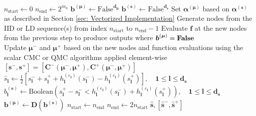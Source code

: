 \documentclass[graybox]{svmult}
\begin{document}
\begin{algorithm}[t]
\begin{algorithmic}
    \\ \hrulefill
    \State $n_\text{start} \gets 0$ 
    \State $n_\text{end} \gets 2^{m_0}$ 
    \State $\boldsymbol{b}^{(\boldsymbol{\mu})} \gets \text{False}^{\boldsymbol{d}_{\boldsymbol{\mu}}}$ 
    \State $\boldsymbol{b}^{(\boldsymbol{s})} \gets \text{False}^{\boldsymbol{d}_{\boldsymbol{s}}}$ 
    \State Set $\boldsymbol{\alpha}^{(\boldsymbol{\mu})}$ based on $\boldsymbol{\alpha}^{(\boldsymbol{s})}$ as described in Section \ref{sec: Vectorized Implementation}
     
        \State Generate nodes from the IID or LD sequence(s) from index $n_\text{start}$ to $n_\text{end}-1$
        \State Evaluate $\boldsymbol{f}$ at the new nodes from the previous step to produce outputs where $\boldsymbol{b}^{(\boldsymbol{\mu})}=\textbf{\text{False}}$ \\ 
        \State Update $\boldsymbol{\mu}^-$ and $\boldsymbol{\mu}^+$ based on the new nodes and function evaluations using the scalar CMC or QMC algorithms applied element-wise 
        \State $[\boldsymbol{s}^-,\boldsymbol{s}^+] = \left[\boldsymbol{C}^-(\boldsymbol{\mu}^-,\boldsymbol{\mu}^+),\boldsymbol{C}^+(\boldsymbol{\mu}^-,\boldsymbol{\mu}^+)\right]$ 
        \State $\hat{s}_{\boldsymbol{l}} \gets \frac{1}{2}\left[s_{\boldsymbol{l}}^-+s_{\boldsymbol{l}}^++h^{(\varepsilon_{\boldsymbol{l}})}_{\boldsymbol{l}}(s_{\boldsymbol{l}}^-)-h^{(\varepsilon_{\boldsymbol{l}})}_{\boldsymbol{l}}(s_{\boldsymbol{l}}^+)\right], \quad\boldsymbol{1} \leq \boldsymbol{l} \leq \boldsymbol{d}_{\boldsymbol{s}}$ 
        \State $b^{(\boldsymbol{s})}_{\boldsymbol{l}} \gets \text{Boolean}\left(s_{\boldsymbol{l}}^+-s_{\boldsymbol{l}}^- < h^{(\varepsilon_{\boldsymbol{l}})}_{\boldsymbol{l}}(s_{\boldsymbol{l}}^-)+h^{(\varepsilon_{\boldsymbol{l}})}_{\boldsymbol{l}}(s_{\boldsymbol{l}}^+)\right),\quad \boldsymbol{1} \leq \boldsymbol{l} \leq \boldsymbol{d}_{\boldsymbol{s}}$ 
        \State $\boldsymbol{b}^{(\boldsymbol{\mu})} \gets \boldsymbol{D}\left(\boldsymbol{b}^{(\boldsymbol{s})}\right)$
        \State $n_\text{start} \gets n_\text{end}$
        \State $n_\text{end} \gets 2n_\text{start}$
    \EndWhile
    \State \Return $\hat{\boldsymbol{s}},[\hat{\boldsymbol{s}}^-,\hat{\boldsymbol{s}}^+]$
    \end{algorithmic}
\end{algorithm}
\end{document}
